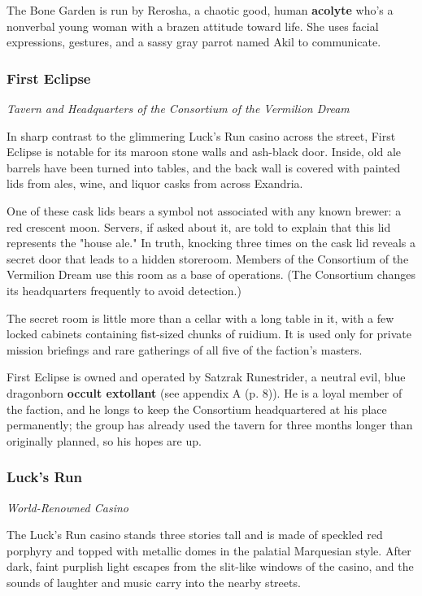 \documentclass[a4paper, 11pt, bg=full, twocolumn, nooutline]{dndbook}
\begin{document}
The Bone Garden is run by Rerosha, a chaotic good, human \textbf{acolyte} who's a nonverbal young woman with a brazen attitude toward life. She uses facial expressions, gestures, and a sassy gray parrot named Akil to communicate.

\subsubsection{First Eclipse}

\textit{Tavern and Headquarters of the Consortium of the Vermilion Dream}

In sharp contrast to the glimmering Luck's Run casino across the street, First Eclipse is notable for its maroon stone walls and ash-black door. Inside, old ale barrels have been turned into tables, and the back wall is covered with painted lids from ales, wine, and liquor casks from across Exandria.

One of these cask lids bears a symbol not associated with any known brewer: a red crescent moon. Servers, if asked about it, are told to explain that this lid represents the "house ale." In truth, knocking three times on the cask lid reveals a secret door that leads to a hidden storeroom. Members of the Consortium of the Vermilion Dream use this room as a base of operations. (The Consortium changes its headquarters frequently to avoid detection.)

The secret room is little more than a cellar with a long table in it, with a few locked cabinets containing fist-sized chunks of ruidium. It is used only for private mission briefings and rare gatherings of all five of the faction's masters.

First Eclipse is owned and operated by Satzrak Runestrider, a neutral evil, blue dragonborn \textbf{occult extollant} (see appendix A (p. 8)). He is a loyal member of the faction, and he longs to keep the Consortium headquartered at his place permanently; the group has already used the tavern for three months longer than originally planned, so his hopes are up.

\subsubsection{Luck's Run}

\textit{World-Renowned Casino}

The Luck's Run casino stands three stories tall and is made of speckled red porphyry and topped with metallic domes in the palatial Marquesian style. After dark, faint purplish light escapes from the slit-like windows of the casino, and the sounds of laughter and music carry into the nearby streets.
\end{document}
